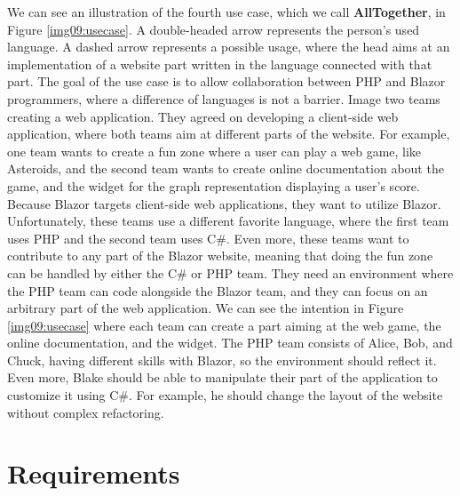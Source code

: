 \par
We can see an illustration of the fourth use case, which we call \textbf{AllTogether}, in Figure \ref{img09:usecase}.
A double-headed arrow represents the person's used language. 
A dashed arrow represents a possible usage, where the head aims at an implementation of a website part written in the language connected with that part.
The goal of the use case is to allow collaboration between PHP and Blazor programmers, where a difference of languages is not a barrier.  
Image two teams creating a web application. 
They agreed on developing a client-side web application, where both teams aim at different parts of the website.
For example, one team wants to create a fun zone where a user can play a web game, like Asteroids, and the second team wants to create online documentation about the game, and the widget for the graph representation displaying a user's score.
Because Blazor targets client-side web applications, they want to utilize Blazor.
Unfortunately, these teams use a different favorite language, where the first team uses PHP and the second team uses C\#.
Even more, these teams want to contribute to any part of the Blazor website, meaning that doing the fun zone can be handled by either the C\# or PHP team.
They need an environment where the PHP team can code alongside the Blazor team, and they can focus on an arbitrary part of the web application.
We can see the intention in Figure \ref{img09:usecase} where each team can create a part aiming at the web game, the online documentation, and the widget.
The PHP team consists of Alice, Bob, and Chuck, having different skills with Blazor, so the environment should reflect it.
Even more, Blake should be able to manipulate their part of the application to customize it using C\#. For example, he should change the layout of the website without complex refactoring. 

\section{Requirements}


